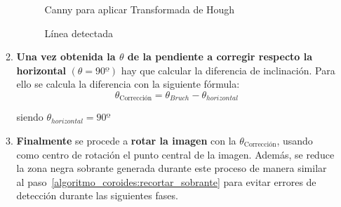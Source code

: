 \begin{enumerate}
\begin{enumerate}[label*=\arabic*.]
    \begin{figure}[H]
      \caption{Canny para aplicar Transformada de Hough}
      \centering \setlength\fboxsep{0pt} \setlength\fboxrule{0.5pt}
    \end{figure}

    \begin{figure}[H]
      \caption{Línea detectada}
      \centering \setlength\fboxsep{0pt} \setlength\fboxrule{0.5pt}
    \end{figure}


  \item \textbf{Una vez obtenida la $\theta$ de la pendiente a corregir
      respecto la horizontal} $\left( \theta = 90º \right)$ hay que
    calcular la diferencia de inclinación. Para ello se calcula la
    diferencia con la siguiente fórmula:
    \begin{equation*}
      \theta_\text{Corrección} = \theta_{Bruch} - \theta_{horizontal}
    \end{equation*}
    \begin{center}
      siendo $\theta_{horizontal} = 90º$
    \end{center}
  \item \textbf{Finalmente} se procede a \textbf{rotar la imagen} con
    la $\theta_{\text{Corrección}}$, usando como centro de rotación el
    punto central de la imagen. Además, se reduce la zona negra
    sobrante generada durante este proceso de manera similar al
    paso~\ref{algoritmo_coroides:recortar_sobrante} para evitar
    errores de detección durante las siguientes fases.


\end{enumerate}
\end{enumerate}
